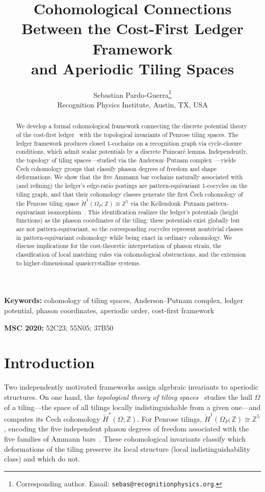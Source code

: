 \documentclass[12pt]{article}
\title{Cohomological Connections Between the Cost-First Ledger Framework\\and Aperiodic Tiling Spaces}
\author{Sebastian Pardo-Guerra\thanks{Corresponding author. Email: \texttt{sebas@recognitionphysics.org}.}\\[4pt]
\small Recognition Physics Institute, Austin, TX, USA}
\date{}
\theoremstyle{definition}
\theoremstyle{remark}
\newcommand{\ZZ}{\mathbb{Z}}
\newcommand{\Hcech}{\check{H}}
\begin{document}
\maketitle

\begin{abstract}
We develop a formal cohomological framework connecting the discrete potential theory of the cost-first ledger~\cite{PardoGuerraEtAl2026} with the topological invariants of Penrose tiling spaces. The ledger framework produces closed 1-cochains on a recognition graph via cycle-closure conditions, which admit scalar potentials by a discrete Poincar\'{e} lemma. Independently, the topology of tiling spaces---studied via the Anderson--Putnam complex~\cite{AndersonPutnam1998}---yields \v{C}ech cohomology groups that classify phason degrees of freedom and shape deformations. We show that the five Ammann bar cochains naturally associated with (and refining) the ledger's edge-ratio postings are pattern-equivariant 1-cocycles on the tiling graph, and that their cohomology classes generate the first \v{C}ech cohomology of the Penrose tiling space $\Hcech^1(\Omega_P;\ZZ)\cong\ZZ^5$ via the Kellendonk--Putnam pattern-equivariant isomorphism~\cite{KellendonkPutnam2006}. This identification realizes the ledger's potentials (height functions) as the phason coordinates of the tiling: these potentials exist globally but are not pattern-equivariant, so the corresponding cocycles represent nontrivial classes in pattern-equivariant cohomology while being exact in ordinary cohomology. We discuss implications for the cost-theoretic interpretation of phason strain, the classification of local matching rules via cohomological obstructions, and the extension to higher-dimensional quasicrystalline systems.
\end{abstract}

\medskip
\noindent\textbf{Keywords:} cohomology of tiling spaces, Anderson--Putnam complex, ledger potential, phason coordinates, aperiodic order, cost-first framework

\medskip
\noindent\textbf{MSC 2020:} 52C23; 55N05; 37B50

\section{Introduction}
\label{sec:intro}

Two independently motivated frameworks assign algebraic invariants to aperiodic structures. On one hand, the \emph{topological theory of tiling spaces}~\cite{AndersonPutnam1998,Sadun2008,BargeSadun2011} studies the hull $\Omega$ of a tiling---the space of all tilings locally indistinguishable from a given one---and computes its \v{C}ech cohomology $\Hcech^*(\Omega; \ZZ)$. For Penrose tilings, $\Hcech^1(\Omega_P; \ZZ) \cong \ZZ^5$, encoding the five independent phason degrees of freedom associated with the five families of Ammann bars~\cite{AndersonPutnam1998,Forrest2002}. These cohomological invariants classify which deformations of the tiling preserve its local structure (local indistinguishability class) and which do not.
\end{document}
